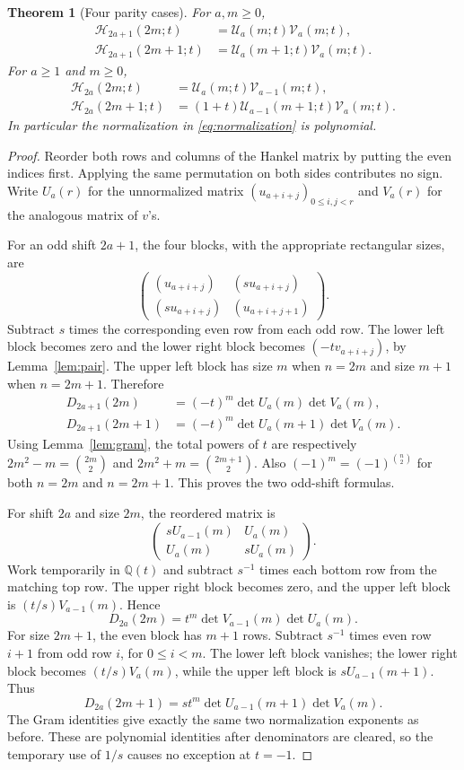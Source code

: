 \documentclass[11pt]{article}
\newtheorem{theorem}{Theorem}[section]
\theoremstyle{definition}
\theoremstyle{remark}
\newcommand{\Q}{\mathbb Q}
\newcommand{\U}{\mathcal U}
\newcommand{\V}{\mathcal V}
\newcommand{\Ht}{\mathcal H}
\theoremstyle{definition}
\theoremstyle{plain}
\numberwithin{equation}{section}
\begin{document}
\begin{theorem}[Four parity cases]
\label{thm:factor}
For $a,m\ge0$,
\begin{align}
 \Ht_{2a+1}(2m;t)&=\U_a(m;t)\V_a(m;t),\label{eq:factor-oo}\\
 \Ht_{2a+1}(2m+1;t)&=\U_a(m+1;t)\V_a(m;t).\label{eq:factor-oe}
\end{align}
For $a\ge1$ and $m\ge0$,
\begin{align}
 \Ht_{2a}(2m;t)&=\U_a(m;t)\V_{a-1}(m;t),\label{eq:factor-eo}\\
 \Ht_{2a}(2m+1;t)&=(1+t)\U_{a-1}(m+1;t)\V_a(m;t).\label{eq:factor-ee}
\end{align}
In particular the normalization in \eqref{eq:normalization} is polynomial.
\end{theorem}
\begin{proof}
Reorder both rows and columns of the Hankel matrix by putting the even
indices first. Applying the same permutation on both sides contributes no
sign. Write $U_a(r)$ for the unnormalized matrix
$(u_{a+i+j})_{0\le i,j<r}$ and $V_a(r)$ for the analogous matrix of $v$'s.

For an odd shift $2a+1$, the four blocks, with the appropriate rectangular
sizes, are
\[
 \begin{pmatrix}
 (u_{a+i+j})& (s u_{a+i+j})\\
 (s u_{a+i+j})& (u_{a+i+j+1})
 \end{pmatrix}.
\]
Subtract $s$ times the corresponding even row from each odd row. The lower
left block becomes zero and the lower right block becomes
$(-t v_{a+i+j})$, by Lemma~\ref{lem:pair}. The upper left block has size
$m$ when $n=2m$ and size $m+1$ when $n=2m+1$. Therefore
\begin{align*}
 D_{2a+1}(2m)&=(-t)^m\det U_a(m)\det V_a(m),\\
 D_{2a+1}(2m+1)&=(-t)^m\det U_a(m+1)\det V_a(m).
\end{align*}
Using Lemma~\ref{lem:gram}, the total powers of $t$ are respectively
$2m^2-m=\binom{2m}{2}$ and $2m^2+m=\binom{2m+1}{2}$.
Also $(-1)^m=(-1)^{\binom n2}$ for both $n=2m$ and $n=2m+1$.
This proves the two odd-shift formulas.

For shift $2a$ and size $2m$, the reordered matrix is
\[
 \begin{pmatrix}sU_{a-1}(m)&U_a(m)\\ U_a(m)&sU_a(m)\end{pmatrix}.
\]
Work temporarily in $\Q(t)$ and subtract $s^{-1}$ times each bottom row
from the matching top row. The upper right block becomes zero, and the
upper left block is $(t/s)V_{a-1}(m)$. Hence
\[
 D_{2a}(2m)=t^m\det V_{a-1}(m)\det U_a(m).
\]
For size $2m+1$, the even block has $m+1$ rows. Subtract $s^{-1}$ times
even row $i+1$ from odd row $i$, for $0\le i<m$. The lower left block
vanishes; the lower right block becomes $(t/s)V_a(m)$, while the upper
left block is $sU_{a-1}(m+1)$. Thus
\[
 D_{2a}(2m+1)=s t^m\det U_{a-1}(m+1)\det V_a(m).
\]
The Gram identities give exactly the same two normalization exponents as
before. These are polynomial identities after denominators are cleared,
so the temporary use of $1/s$ causes no exception at $t=-1$.
\end{proof}
\end{document}

